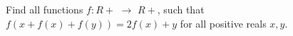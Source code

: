 Find all functions $f:R+$ $\rightarrow$ $R+$, such that $f(x+f(x)+f(y))=2f(x)+y$ for all positive reals $x,y$.
